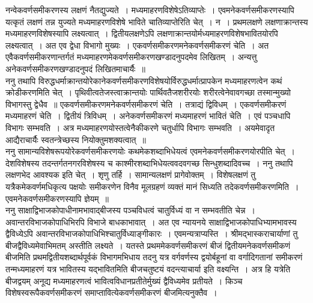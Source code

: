 \documentclass[11pt, openany]{book}
\begin{document}
\vspace{-3mm}
 नन्वेकवर्णसमीकरणस्य लक्षणं नैतद्युज्यते~। मध्यमाहरणविशेषेऽतिव्याप्तेः~। एवमनेकवर्णसमीकरणस्यापि यत्कृतं लक्षणं तन्न युज्यते 
मध्यमाहरणविशेषे भाविते चातिव्याप्तेरिति चेत्~। न~। प्रथमलक्षणे
लक्षणाक्रान्तस्य मध्यमाहरणविशेषस्यापि लक्ष्यत्वात्~। द्वितीयलक्षणेऽपि
लक्षणाक्रान्तयोर्मध्यमाहरणविशेषभावितयोरपि लक्ष्यत्वात्~। अत एव द्वेधा विभागो 
मुख्यः~। एकवर्णसमीकरणमनेकवर्णसमीकरणं चेति~। अत एवैकवर्णसमीकरणान्तर्गतं मध्यमाहरणमेकवर्णसमीकरणखण्डादनुपदमेव लिखितम्~। अन्यत्तु 
अनेकवर्णसमीकरणखण्डादनुपदं लिखितमाचार्यैः~॥~\\

\vspace{-3mm}
 ननु तथापि विरुद्धधर्माक्रान्तयोरेकानेकवर्णसमीकरणविशेषयोर्विरुद्धधर्मात्प्रापकेन मध्यमाहरणत्वेन कथं क्रोडीकरणमिति चेत्~। पृथिवीत्वतेजस्त्वाक्रान्तयोः पार्थिवतैजशरीरयोः शरीरत्वेनेवावगच्छा तस्मान्मुख्यो विभागस्तु द्वेधैव~॥
\afterpage{\fancyhead[RO,LE]{\textbf{\thepage}}}
\cfoot{}
\thispagestyle{empty}
\newpage
एकवर्णसमीकरणमनेकवर्णसमीकरणं चेति~। तत्राद्यं द्विविधम्~। एकवर्णसमीकरणं मध्यमाहरणं चेति~। द्वितीयं त्रिविधम्~। अनेकवर्णसमीकरणं मध्यमाहरणं भावितं चेति~। एवं पञ्चधापि विभागः सम्भवति~। अत्र मध्यमाहरणयोस्तत्वेनैकीकरणे चतुर्धापि विभागः सम्भवति~। अयमेवादृत आद्यैराचार्यैः स्वतन्त्रेच्छस्य नियोक्तुमशक्यत्वात्~॥~\\

\vspace{-3mm}
 ननु सामान्यविशेषरूपयोरेकवर्णसमीकरणयोः कथमेकशब्दाभिधेयत्वं एवमनेकवर्णसमीकरणयोरपीति चेत्~। देशविशेषस्य तदन्तर्गतनगरविशेषस्य च 
काश्मीरशब्दाभिधेयत्ववदवगच्छ सिन्धुशब्दादिवच्च~। ननु तथापि लक्षणभेद 
आवश्यक इति चेत्~। शृणु तर्हि~। सामान्यलक्षणं प्रागेवोक्तम्~। विशेषलक्षणं तु यत्रैकमेकवर्णमधिकृत्य पक्षयोः समीकरणेन विनैव मूलग्रहणं व्यक्तं मानं सिध्यति तदेकवर्णसमीकरणमिति~। एवमनेकवर्णसमीकरणस्यापि ज्ञेयम्~॥~\\

\vspace{-3mm}
 ननु साक्षाद्विभाजकोपाधीनामभावाद्बीजस्य पञ्चविधत्वं चातुर्विध्यं वा 
न सम्भवतीति चेन्न~। अवान्तरविभाजकोपाधिभिरपि विभाजे बाधकाभावात्~। 
अत एव न्यायनये साक्षाद्विभाजकोपाधिभ्यामभावस्य द्वैविध्येऽपि 
अवान्तरविभाजकोपाधिभिश्चातुर्विध्याङ्गीकारः~। एवमन्यत्राप्यस्ति~। श्रीमद्भास्कराचार्याणां तु बीजद्वैविध्यमेवाभिमतम् अस्तीति लक्ष्यते~। यतस्ते प्रथममेकवर्णसमीकरणं बीजं
द्वितीयमनेकवर्णसमीकणं बीजमिति प्रथमद्वितीयशब्दार्थपूर्वकं विभागमभिधाय 
तदनु यत्र वर्गवर्णस्य द्वयोर्बहूनां वा वर्गादिगतानां समीकरणं तन्मध्यमाहरणं 
यत्र भावितस्य यद्भावितमिति बीजचतुष्टयं वदन्त्याचार्या इति वक्ष्यन्ति~।
अत्र हि यत्रेति बीजद्वयम् अनूद्य मध्यमाहरणत्वं भावित्वविधानप्रतीतेर्मुख्यं
द्वैविध्यमेव प्रतीयते~। किञ्च विशेषस्वरूपैकवर्णसमीकरणं समाप्तावित्येकवर्णसमीकरणं 
बीजमित्यनुक्तैव~। \\
\end{document}
